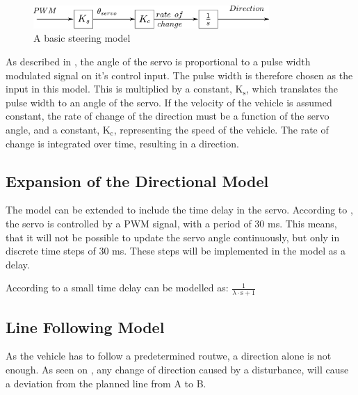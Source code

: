 \begin{figure}[H]
	\centering
	\includegraphics[width=0.8\textwidth]{figures/basicSteeringModel.pdf}
	\caption{A basic steering model}
	\label{basicSteering}
\end{figure}
 
As described in , the angle of the servo is proportional to a pulse width modulated signal on it's control input. The pulse width is therefore chosen as the input in this model. This is multiplied by a constant, $\text{K}_\text{s}$, which translates the pulse width to an angle of the servo.
If the velocity of the vehicle is assumed constant, the rate of change of the direction must be a function of the servo angle, and a constant, $\text{K}_\text{c}$, representing the speed of the vehicle.
The rate of change is integrated over time, resulting in a direction. 

\subsection{Expansion of the Directional Model}

The model can be extended to include the time delay in the servo. According to , the servo is controlled by a PWM signal, with a period of 30 ms. This means, that it will not be possible to update the servo angle continuously, but only in discrete time steps of 30 ms. These steps will be implemented in the model as a delay.



According to  a small time delay can be modelled as:
$\frac{1}{\lambda\cdot\text{s}+1}$ 



\subsection{Line Following Model}
As the vehicle has to follow a predetermined routwe, a direction alone is not enough. As seen on , any change of direction caused by a disturbance, will cause a deviation from the planned line from A to B.

